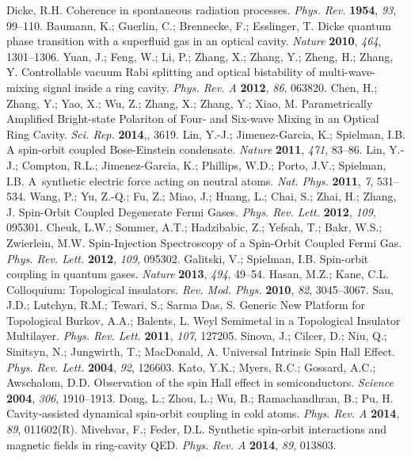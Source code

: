 \documentclass[atoms,article,accept,moreauthors,pdftex,12pt,a4paper]{mdpi}
\begin{document}
\begin{thebibliography}{----}

Dicke, R.H. Coherence in spontaneous radiation processes. {\em Phys. Rev.} {\bf 1954}, {\em 93}, 99--110.
Baumann, K.; Guerlin, C.; Brennecke, F.; Esslinger, T. Dicke quantum phase transition with a superfluid gas in an optical cavity. {\em Nature} {\bf 2010}, {\em 464}, 1301--1306.
 Yuan, J.; Feng, W.; Li, P.; Zhang, X.; Zhang, Y.; Zheng, H.; Zhang, Y. Controllable vacuum Rabi splitting and optical bistability of multi-wave-mixing signal inside a ring cavity. {\em Phys. Rev. A} {\bf 2012}, {\em 86}, 063820.
 Chen, H.; Zhang, Y.; Yao, X.; Wu, Z.; Zhang, X.; Zhang, Y.; Xiao, M. Parametrically Amplified Bright-state Polariton of Four- and Six-wave Mixing in an Optical Ring Cavity. {\em Sci. Rep.} {\bf 2014},, 3619.
Lin, Y.-J.; Jimenez-Garcia, K.; Spielman, I.B. A spin-orbit coupled Bose-Einstein condensate. {\em Nature} {\bf 2011}, {\em 471}, 83--86.
Lin, Y.-J.; Compton, R.L.; Jimenez-Garcia, K.; Phillips, W.D.; Porto, J.V.; Spielman, I.B. A~synthetic electric force acting on neutral atoms. {\em Nat. Phys.} {\bf 2011}, {\em 7}, 531--534.
Wang, P.; Yu, Z.-Q.; Fu, Z.; Miao, J.; Huang, L.; Chai, S.; Zhai, H.; Zhang, J. Spin-Orbit Coupled Degenerate Fermi Gases. {\em Phys. Rev. Lett.} {\bf 2012}, {\em 109}, 095301.
Cheuk, L.W.; Sommer, A.T.; Hadzibabic, Z.; Yefsah, T.; Bakr, W.S.; Zwierlein, M.W. Spin-Injection Spectroscopy of a Spin-Orbit Coupled Fermi Gas. {\em Phys. Rev. Lett.} {\bf 2012}, {\em 109}, 095302.
Galitski, V.; Spielman, I.B. Spin-orbit coupling in quantum gases. {\em Nature} {\bf 2013}, {\em 494}, 49--54.
Hasan, M.Z.; Kane, C.L. Colloquium: Topological insulators. {\em Rev. Mod. Phys.} {\bf 2010}, {\em 82}, 3045--3067.
Sau, J.D.; Lutchyn, R.M.; Tewari, S.; Sarma Das, S. Generic New Platform for Topological 
Burkov, A.A.; Balents, L. Weyl Semimetal in a Topological Insulator Multilayer. {\em Phys. Rev. Lett.} {\bf 2011}, {\em 107}, 127205.
Sinova, J.; Cilcer, D.; Niu, Q.; Sinitsyn, N.; Jungwirth, T.; MacDonald, A. Universal Intrinsic Spin Hall Effect. {\em Phys. Rev. Lett.} {\bf 2004}, {\em 92}, 126603.
Kato, Y.K.; Myers, R.C.; Gossard, A.C.; Awschalom, D.D. Observation of the spin Hall effect in semiconductors. {\em Science} {\bf 2004}, {\em 306}, 1910--1913.
Dong, L.; Zhou, L.; Wu, B.; Ramachandhran, B.; Pu, H. Cavity-assisted dynamical spin-orbit coupling in cold atoms. {\em Phys. Rev. A} {\bf 2014}, {\em 89}, 011602(R).
Mivehvar, F.; Feder, D.L. Synthetic spin-orbit interactions and magnetic fields in ring-cavity QED. {\em Phys. Rev. A} {\bf 2014}, {\em 89}, 013803.


\end{thebibliography}
\end{document}
